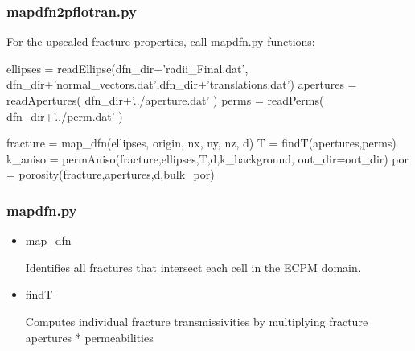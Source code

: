 \documentclass{beamer}
\newcommand\magentacomment[1]{{{\color{magenta} #1}}}
\begin{document}
\begin{frame} \frametitle{mapdfn2pflotran.py}
	For the upscaled fracture properties, call mapdfn.py functions:
	\begin{semiverbatim}
		
		ellipses = readEllipse(dfn_dir+'radii_Final.dat',
		  dfn_dir+'normal_vectors.dat',dfn_dir+'translations.dat')
		apertures = readApertures( dfn_dir+'../aperture.dat' )
		perms = readPerms( dfn_dir+'../perm.dat' )
		
		fracture = \magentacomment{map_dfn}(ellipses, origin, nx, ny, nz, d)
		T = \magentacomment{findT}(apertures,perms)
		k_aniso = \magentacomment{permAniso}(fracture,ellipses,T,d,k_background, 
		  out_dir=out_dir)
		por = \magentacomment{porosity}(fracture,apertures,d,bulk_por)
		
	\end{semiverbatim}
	
\end{frame}

\begin{frame} \frametitle{mapdfn.py}
	\begin{itemize}
		\item \begin{semiverbatim}\magentacomment{map_dfn}\end{semiverbatim} Identifies all fractures that intersect each cell in the ECPM domain. 
		\item \begin{semiverbatim}\magentacomment{findT}\end{semiverbatim}  Computes individual fracture transmissivities by multiplying fracture apertures * permeabilities
	\end{itemize}
	
\end{frame}
\end{document}
